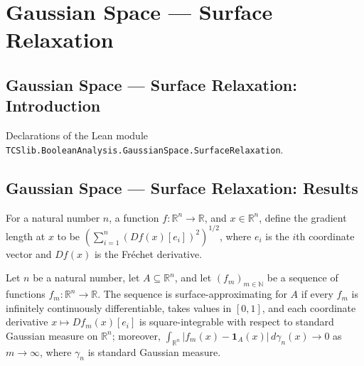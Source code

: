 \section{Gaussian Space --- Surface Relaxation}
\subsection*{Gaussian Space --- Surface Relaxation: Introduction}

Declarations of the Lean module \texttt{TCSlib.BooleanAnalysis.GaussianSpace.SurfaceRelaxation}.

\subsection*{Gaussian Space --- Surface Relaxation: Results}

\begin{definition}
\label{BooleanAnalysis.GaussianSpace.gaussianGradientLength}
\leanok
For a natural number $n$, a function $f:\mathbb{R}^n\to\mathbb{R}$, and
$x\in\mathbb{R}^n$, define the gradient length at $x$ to be $\left(\sum_{i=1}^n
(Df(x)[e_i])^2\right)^{1/2}$, where $e_i$ is the $i$th coordinate vector and $Df(x)$ is
the Fréchet derivative.
\end{definition}

\begin{definition}
\label{BooleanAnalysis.GaussianSpace.IsSurfaceApproximatingSequence}
\leanok
{}
Let $n$ be a natural number, let $A\subseteq\mathbb{R}^n$, and let
$(f_m)_{m\in\mathbb{N}}$ be a sequence of functions $f_m:\mathbb{R}^n\to\mathbb{R}$. The
sequence is surface-approximating for $A$ if every $f_m$ is infinitely continuously
differentiable, takes values in $[0,1]$, and each coordinate derivative $x\mapsto
Df_m(x)[e_i]$ is square-integrable with respect to standard Gaussian measure on
$\mathbb{R}^n$; moreover, $\int_{\mathbb{R}^n}|f_m(x)-\mathbf{1}_A(x)|\,d\gamma_n(x)\to
0$ as $m\to\infty$, where $\gamma_n$ is standard Gaussian measure.
\end{definition}

